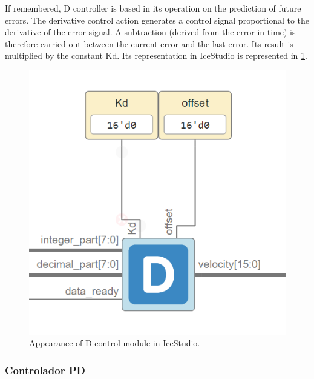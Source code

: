 If remembered, D controller is based in its operation on the prediction of future errors. The derivative control action generates a control signal proportional to the derivative of the error signal. \newline
A subtraction (derived from the error in time) is therefore carried out between the current error and the last error. Its result is multiplied by the constant Kd. Its representation in IceStudio is represented in \ref{fig:Dcontrol}.

\begin{figure}[H]
	\center
	\includegraphics[scale=0.5]{imagenes/Balancing_robot/Dcontrol}
	\caption{Appearance of D control module in IceStudio.}
	\label{fig:Dcontrol}
\end{figure}

\subsubsection{Controlador PD}

